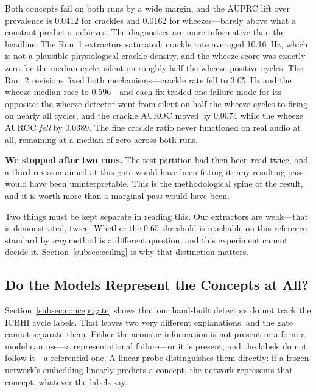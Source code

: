 \documentclass[journal,onecolumn]{IEEEtran}
\begin{document}
Both concepts fail on both runs by a wide margin, and the AUPRC lift over prevalence
is 0.0412 for crackles and 0.0162 for wheezes---barely above what a constant
predictor achieves. The diagnostics are more informative than the headline. The Run~1
extractors saturated: crackle rate averaged 10.16~Hz, which is not a plausible
physiological crackle density, and the wheeze score was exactly zero for the median
cycle, silent on roughly half the wheeze-positive cycles. The Run~2 revisions fixed
both mechanisms---crackle rate fell to 3.05~Hz and the wheeze median rose to
0.596---and each fix traded one failure mode for its opposite: the wheeze detector
went from silent on half the wheeze cycles to firing on nearly all cycles, and the
crackle AUROC moved by 0.0074 while the wheeze AUROC \emph{fell} by 0.0389. The fine
crackle ratio never functioned on real audio at all, remaining at a median of zero
across both runs.

\textbf{We stopped after two runs.} The test partition had then been read twice, and a
third revision aimed at this gate would have been fitting it; any resulting pass would
have been uninterpretable. This is the methodological spine of the result, and it is
worth more than a marginal pass would have been.

Two things must be kept separate in reading this. Our extractors are weak---that is
demonstrated, twice. Whether the 0.65 threshold is reachable on this reference
standard by \emph{any} method is a different question, and this experiment cannot
decide it. Section~\ref{subsec:ceiling} is why that distinction matters.

\subsection{Do the Models Represent the Concepts at All?}
\label{subsec:probe}

Section~\ref{subsec:conceptgate} shows that our hand-built detectors do not track the
ICBHI cycle labels. That leaves two very different explanations, and the gate cannot
separate them. Either the acoustic information is not present in a form a model can
use---a representational failure---or it is present, and the labels do not follow it---a
referential one. A linear probe distinguishes them directly: if a frozen network's
embedding linearly predicts a concept, the network represents that concept, whatever
the labels say.
\end{document}
